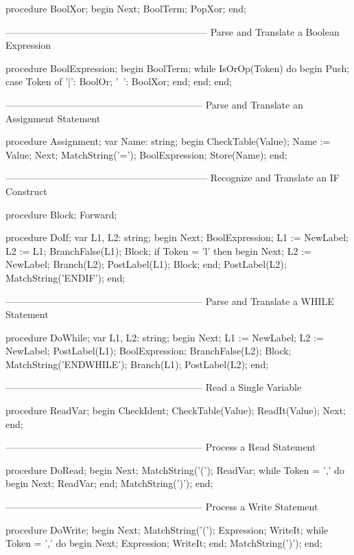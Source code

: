 \documentclass[float=false, crop=false]{standalone}
\begin{document}
\begin{code}
procedure BoolXor;
begin
   Next;
   BoolTerm;
   PopXor;
end;


{---------------------------------------------------------------}
{ Parse and Translate a Boolean Expression }

procedure BoolExpression;
begin
   BoolTerm;
   while IsOrOp(Token) do begin
      Push;
      case Token of
       '|': BoolOr;
       '~': BoolXor;
      end;
   end;
end;


{--------------------------------------------------------------}
{ Parse and Translate an Assignment Statement }

procedure Assignment;
var Name: string;
begin
   CheckTable(Value);
   Name := Value;
   Next;
   MatchString('=');
   BoolExpression;
   Store(Name);
end;


{---------------------------------------------------------------}
{ Recognize and Translate an IF Construct }

procedure Block; Forward;

procedure DoIf;
var L1, L2: string;
begin
   Next;
   BoolExpression;
   L1 := NewLabel;
   L2 := L1;
   BranchFalse(L1);
   Block;
   if Token = 'l' then begin
      Next;
      L2 := NewLabel;
      Branch(L2);
      PostLabel(L1);
      Block;
   end;
   PostLabel(L2);
   MatchString('ENDIF');
end;


{--------------------------------------------------------------}
{ Parse and Translate a WHILE Statement }

procedure DoWhile;
var L1, L2: string;
begin
   Next;
   L1 := NewLabel;
   L2 := NewLabel;
   PostLabel(L1);
   BoolExpression;
   BranchFalse(L2);
   Block;
   MatchString('ENDWHILE');
   Branch(L1);
   PostLabel(L2);
end;


{--------------------------------------------------------------}
{ Read a Single Variable }

procedure ReadVar;
begin
   CheckIdent;
   CheckTable(Value);
   ReadIt(Value);
   Next;
end;


{--------------------------------------------------------------}
{ Process a Read Statement }

procedure DoRead;
begin
   Next;
   MatchString('(');
   ReadVar;
   while Token = ',' do begin
      Next;
      ReadVar;
   end;
   MatchString(')');
end;


{--------------------------------------------------------------}
{ Process a Write Statement }

procedure DoWrite;
begin
   Next;
   MatchString('(');
   Expression;
   WriteIt;
   while Token = ',' do begin
      Next;
      Expression;
      WriteIt;
   end;
   MatchString(')');
end;



\end{code}
\end{document}
